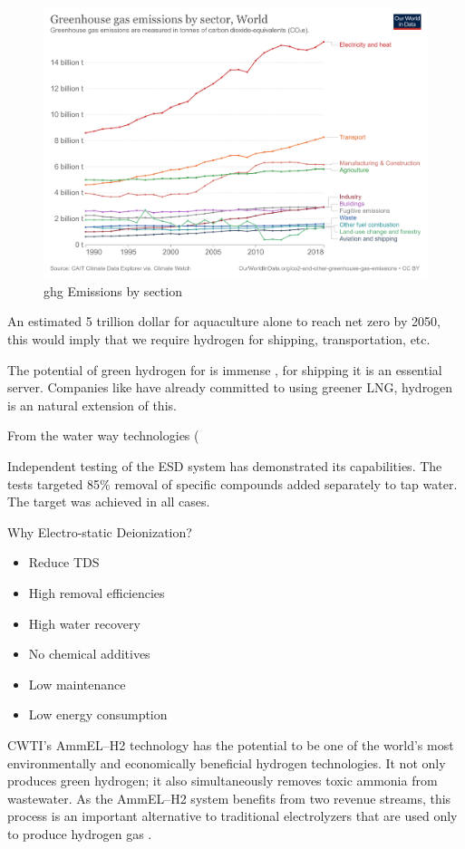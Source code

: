 \begin{figure}[h]
\includegraphics[width=\textwidth]{src/media/ghg-emissions-by-sector.png}
\caption{ghg Emissions by section}
\end{figure}

An estimated 5 trillion dollar for aquaculture alone \cite{goldman_sachs_hydrogen_2022} to reach net zero by 2050, this would imply that we require hydrogen for shipping, transportation, etc.


The potential of green hydrogen for is immense \cite{shipping_green_hydrogen}, for shipping it is an essential server. Companies like  have already committed to using greener LNG, hydrogen is an natural extension of this.

From the water way technologies (

Independent testing of the ESD system has demonstrated its capabilities. The tests targeted 85\% removal of specific compounds added separately to tap water. The target was achieved in all cases. \cite{cwti_esd}

Why Electro-static Deionization? 
\begin{itemize}
    \item Reduce TDS
    \item High removal efficiencies
    \item High water recovery
    \item No chemical additives
    \item Low maintenance
    \item Low energy consumption
\end{itemize}


\begin{blockquote}
CWTI’s AmmEL–H2 technology has the potential to be one of the world’s most environmentally and economically beneficial hydrogen technologies. It not only produces green hydrogen; it also simultaneously removes toxic ammonia from wastewater. As the AmmEL–H2 system benefits from two revenue streams, this process is an important alternative to traditional electrolyzers that are used only to produce hydrogen gas \cite{ctwi_green_hydrogen}.
\end{blockquote}

